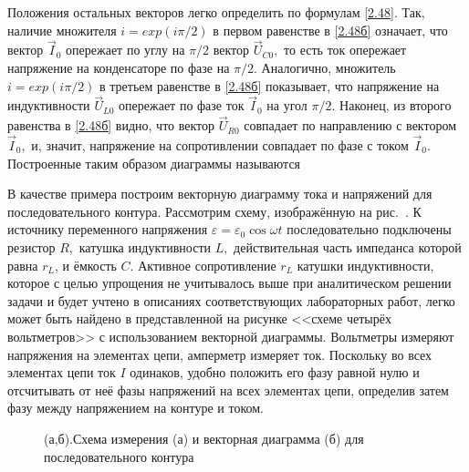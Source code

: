 Положения остальных векторов легко определить по формулам \eqref{2.48}. Так, наличие множителя $i=exp(i\pi/2)$ в первом равенстве в \eqref{2.48б} означает, что вектор $\vec I_0$ опережает по углу на $\pi/2$ вектор $\vec U_{C0},$ то есть ток опережает напряжение на конденсаторе по фазе на $\pi/2.$ Аналогично, множитель $i=exp(i\pi/2)$ в третьем равенстве в \eqref{2.48б} показывает, что напряжение на индуктивности $\vec U_{L0}$ опережает по фазе ток $\vec I_0$ на угол $\pi/2.$ Наконец, из второго равенства в \eqref{2.48б} видно, что вектор $\vec U_{R0}$ совпадает по направлению с вектором $\vec I_0,$ и, значит, напряжение на сопротивлении совпадает по фазе с током $\vec I_0$. Построенные таким образом диаграммы называются 

В качестве примера построим векторную диаграмму тока и напряжений для последовательного контура. Рассмотрим схему, изображённую на рис.~. К источнику переменного напряжения $\varepsilon=\varepsilon_0\cos\omega t$ последовательно подключены резистор $R,$ катушка индуктивности $L,$ действительная часть импеданса которой равна $r_L$, и ёмкость $C.$ Активное сопротивление $r_L$ катушки индуктивности, которое с целью упрощения не учитывалось выше при аналитическом решении задачи и будет учтено в описаниях соответствующих лабораторных работ, легко может быть найдено в представленной на рисунке <<схеме четырёх вольтметров>> с использованием векторной диаграммы. Вольтметры измеряют напряжения на элементах цепи, амперметр измеряет ток. Поскольку во всех элементах цепи ток $I$ одинаков, удобно положить его фазу равной нулю и отсчитывать от неё фазы напряжений на всех элементах цепи, определив затем фазу   между напряжением на контуре и током.

\begin{figure}[h]
	\begin{minipage}[h]{0.37\linewidth}
	\end{minipage}
	\hfill
	\begin{minipage}[h]{0.49\linewidth}
	\end{minipage}
	\caption{(а,б).Схема измерения (а) и векторная  диаграмма (б) для последовательного контура}
\end{figure}

